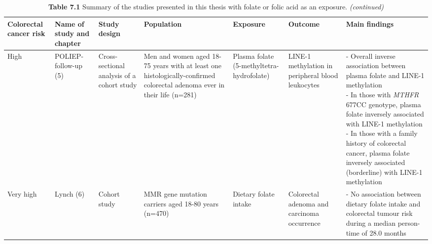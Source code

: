 \documentclass[10pt, letterpaper, twoside]{book} %
\begin{document}
\begin{sidewaystable}
\footnotesize
\caption*{\textbf{Table 7.1} {Summary of the studies presented in this thesis with folate or folic acid as an exposure.} \emph{(continued)}}
\label{table7_1}
\begin{tabular}{L{1.3cm}C{1.5cm}C{2cm}C{2.1cm}C{2.1cm}C{2.1cm}C{4cm}}
\hline
\bfseries Colorectal cancer risk & \bfseries Name of study and chapter & \bfseries Study design & \bfseries Population & \bfseries Exposure & \bfseries Outcome & \bfseries Main findings\\
\hline
\parbox[t][5cm]{1.3cm}{High} &
\parbox[t][5cm]{1.5cm}{\centering POLIEP-follow-up (5)} &
\parbox[t][5cm]{2cm}{\centering Cross-sectional analysis of a cohort study} &
\parbox[t][5cm]{2.1cm}{\centering Men and women aged 18-75 years with at least one histologically-confirmed colorectal adenoma ever in their life (n=281)} &
\parbox[t][5cm]{2.1cm}{\centering Plasma folate (5-methyltetra-hydrofolate)} &
\parbox[t][5cm]{2.1cm}{\centering LINE-1 methylation in peripheral blood leukocytes} &
\parbox[t][5cm]{4cm}{\centering - Overall inverse association between plasma folate and LINE-1 methylation \\ - In those with \emph{MTHFR} 677CC genotype, plasma folate inversely associated with LINE-1 methylation \\ - In those with a family history of colorectal cancer, plasma folate inversely associated (borderline) with LINE-1 methylation}\\

\parbox[t][2.3cm]{1.3cm}{Very high} &
\parbox[t][2.3cm]{1.5cm}{\centering Lynch (6)} &
\parbox[t][2.3cm]{2cm}{\centering Cohort study} &
\parbox[t][2.3cm]{2.1cm}{\centering MMR gene mutation carriers aged 18-80 years (n=470)} &
\parbox[t][2.3cm]{2.1cm}{\centering Dietary folate intake} &
\parbox[t][2.3cm]{2.1cm}{\centering Colorectal adenoma and carcinoma occurrence} &
\parbox[t][2.3cm]{4cm}{ \centering - No association between dietary folate intake and colorectal tumour risk during a median person-time of 28.0 months}\\
\hline
\end{tabular}
\end{sidewaystable}
\end{document}
